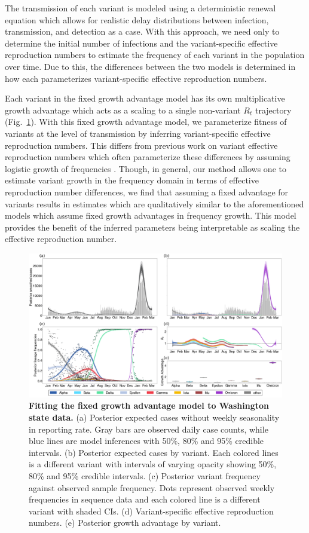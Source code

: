 \documentclass[11pt,oneside,letterpaper]{article}
\begin{document}
The transmission of each variant is modeled using a deterministic renewal equation which allows for realistic delay distributions between infection, transmission, and detection as a case.
With this approach, we need only to determine the initial number of infections and the variant-specific effective reproduction numbers to estimate the frequency of each variant in the population over time.
Due to this, the differences between the two models is determined in how each parameterizes variant-specific effective reproduction numbers.

Each variant in the fixed growth advantage model has its own multiplicative growth advantage which acts as a scaling to a single non-variant $R_{t}$ trajectory (Fig.~\ref{fig:fixed_growth_Washington}).
With this fixed growth advantage model, we parameterize fitness of variants at the level of transmission by inferring variant-specific effective reproduction numbers.
This differs from previous work on variant effective reproduction numbers which often parameterize these differences by assuming logistic growth of frequencies \cite{Earnest2021, Vhringer2021}.
Though, in general, our method allows one to estimate variant growth in the frequency domain in terms of effective reproduction number differences, we find that assuming a fixed advantage for variants results in estimates which are qualitatively similar to the aforementioned models which assume fixed growth advantages in frequency growth.
This model provides the benefit of the inferred parameters being interpretable as scaling the effective reproduction number.

\begin{figure}[h!]
  \centering
  \includegraphics[width=\linewidth]{figs/fixed_growth_Washington.png}
  \caption{\textbf{Fitting the fixed growth advantage model to Washington state data.}
  (a) Posterior expected cases without weekly seasonality in reporting rate.
  Gray bars are observed daily case counts, while blue lines are model inferences with 50\%, 80\% and 95\% credible intervals.
  (b) Posterior expected cases by variant.
  Each colored lines is a different variant with intervals of varying opacity showing 50\%, 80\% and 95\% credible intervals.
  (c) Posterior variant frequency against observed sample frequency.
  Dots represent observed weekly frequencies in sequence data and each colored line is a different variant with shaded CIs.
  (d) Variant-specific effective reproduction numbers.
  (e) Posterior growth advantage by variant.}
  \label{fig:fixed_growth_Washington}
\end{figure}
\end{document}
